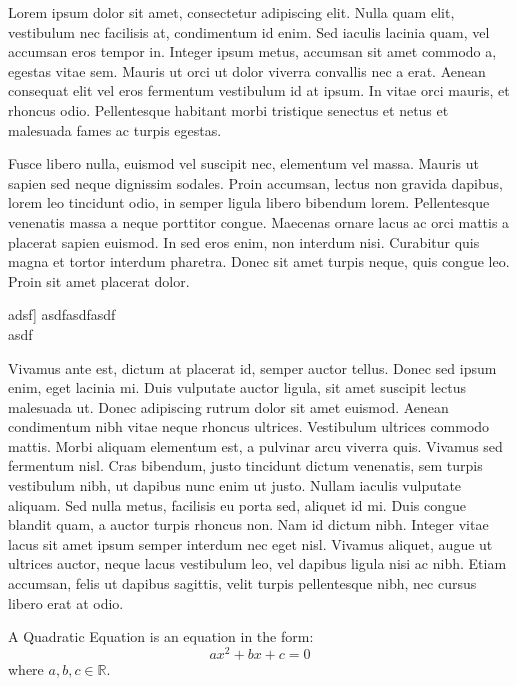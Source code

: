 \documentclass[a4paper,9pt]{scrartcl}
\makeatletter
\newcommand\LabFrame[2]{%
    \fboxrule=\FrameRule
    \fboxsep=-\errorsize
    \textcolor{FrameColor}{%
    \fbox{%
      \vbox{\nobreak
      \advance\FrameSep\errorsize
      \begingroup
        \advance\baselineskip\FrameSep
        \hrule height \baselineskip
        \nobreak
        \vskip-\baselineskip
      \endgroup
      \vskip 0.5\FrameSep
      \hbox{\hskip\FrameSep \strut
        \textcolor{TitleColor}{\textbf{#1}}}%
      \nobreak \nointerlineskip
      \vskip 1.3\FrameSep
      \hbox{\hskip\FrameSep
        {\normalcolor#2}%
        \hskip\FrameSep}%
      \vskip\FrameSep
    }}%
}}
\newenvironment{contlabelframe}[2][\Frame@Lab\ (cont.)]{%
  \def\Frame@Lab{#2}%
  \def\FrameCommand{\LabFrame{#2}}%
  \def\FirstFrameCommand{\LabFrame{#2}}%
  \def\MidFrameCommand{\LabFrame{#1}}%
  \def\LastFrameCommand{\LabFrame{#1}}%
  \MakeFramed{\advance\hsize-\width \FrameRestore}
}{\endMakeFramed}
\newcounter{definition}
\newenvironment{definition}[1]{%
  \par
  \refstepcounter{definition}%
  \begin{contlabelframe}{Definition \thedefinition:\quad #1}
 \noindent\ignorespaces}
{\end{contlabelframe}}
\makeatother
\begin{document}
Lorem ipsum dolor sit amet, consectetur adipiscing elit. Nulla quam elit, vestibulum nec facilisis at, condimentum id enim. Sed iaculis lacinia quam, vel accumsan eros tempor in. Integer ipsum metus, accumsan sit amet commodo a, egestas vitae sem. Mauris ut orci ut dolor viverra convallis nec a erat. Aenean consequat elit vel eros fermentum vestibulum id at ipsum. In vitae orci mauris, et rhoncus odio. Pellentesque habitant morbi tristique senectus et netus et malesuada fames ac turpis egestas.

Fusce libero nulla, euismod vel suscipit nec, elementum vel massa. Mauris ut sapien sed neque dignissim sodales. Proin accumsan, lectus non gravida dapibus, lorem leo tincidunt odio, in semper ligula libero bibendum lorem. Pellentesque venenatis massa a neque porttitor congue. Maecenas ornare lacus ac orci mattis a placerat sapien euismod. In sed eros enim, non interdum nisi. Curabitur quis magna et tortor interdum pharetra. Donec sit amet turpis neque, quis congue leo. Proin sit amet placerat dolor.

 \begin{definition}[adsf]
asdfasdfasdf\\
asdf
 \end{definition}

Vivamus ante est, dictum at placerat id, semper auctor tellus. Donec sed ipsum enim, eget lacinia mi. Duis vulputate auctor ligula, sit amet suscipit lectus malesuada ut. Donec adipiscing rutrum dolor sit amet euismod. Aenean condimentum nibh vitae neque rhoncus ultrices. Vestibulum ultrices commodo mattis. Morbi aliquam elementum est, a pulvinar arcu viverra quis. Vivamus sed fermentum nisl. Cras bibendum, justo tincidunt dictum venenatis, sem turpis vestibulum nibh, ut dapibus nunc enim ut justo. Nullam iaculis vulputate aliquam. Sed nulla metus, facilisis eu porta sed, aliquet id mi. Duis congue blandit quam, a auctor turpis rhoncus non. Nam id dictum nibh. Integer vitae lacus sit amet ipsum semper interdum nec eget nisl. Vivamus aliquet, augue ut ultrices auctor, neque lacus vestibulum leo, vel dapibus ligula nisi ac nibh. Etiam accumsan, felis ut dapibus sagittis, velit turpis pellentesque nibh, nec cursus libero erat at odio.

\begin{definition}{Quadratic Equation}
A Quadratic Equation is an equation in the form:
\begin{equation}
ax^2+bx+c=0
\end{equation}
where \(a,b,c\in\mathbb{R}\).
\end{definition}
\end{document}
